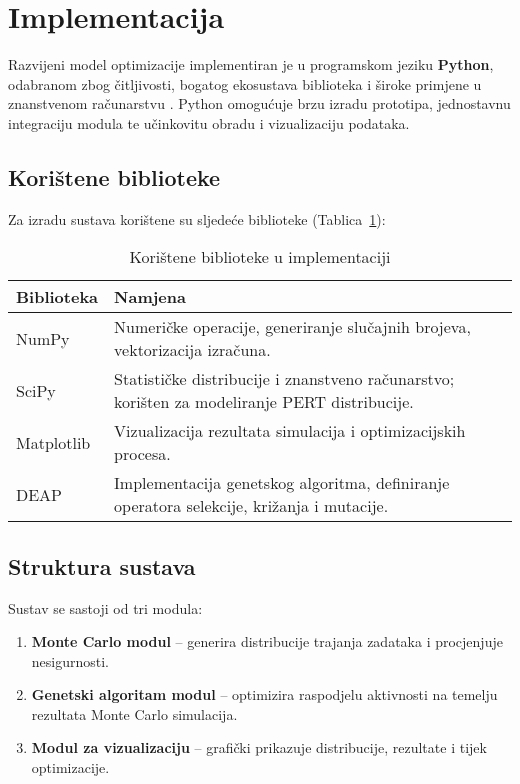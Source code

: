
\section{Implementacija}

Razvijeni model optimizacije implementiran je u programskom jeziku \textbf{Python}, odabranom zbog čitljivosti, bogatog ekosustava biblioteka i široke primjene u znanstvenom računarstvu \cite{PythonSoftwareFoundation}. Python omogućuje brzu izradu prototipa, jednostavnu integraciju modula te učinkovitu obradu i vizualizaciju podataka.

\subsection{Korištene biblioteke}

Za izradu sustava korištene su sljedeće biblioteke (Tablica~\ref{tab:biblioteke}):

\begin{table}[H]
\centering
\caption{Korištene biblioteke u implementaciji}
\label{tab:biblioteke}
\begin{tabular}{|l|p{10cm}|}
\hline
\textbf{Biblioteka} & \textbf{Namjena} \\ \hline
NumPy & Numeričke operacije, generiranje slučajnih brojeva, vektorizacija izračuna. \\ \hline
SciPy & Statističke distribucije i znanstveno računarstvo; korišten za modeliranje PERT distribucije. \\ \hline
Matplotlib & Vizualizacija rezultata simulacija i optimizacijskih procesa. \\ \hline
DEAP & Implementacija genetskog algoritma, definiranje operatora selekcije, križanja i mutacije. \\ \hline
\end{tabular}
\end{table}

\subsection{Struktura sustava}

Sustav se sastoji od tri modula:
\begin{enumerate}
    \item \textbf{Monte Carlo modul} – generira distribucije trajanja zadataka i procjenjuje nesigurnosti.
    \item \textbf{Genetski algoritam modul} – optimizira raspodjelu aktivnosti na temelju rezultata Monte Carlo simulacija.
    \item \textbf{Modul za vizualizaciju} – grafički prikazuje distribucije, rezultate i tijek optimizacije.
\end{enumerate}

